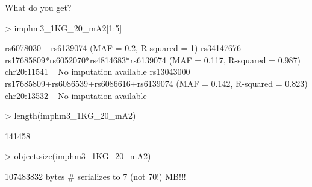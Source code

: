 \clearpage

{\huge What do you get?}

\begin{Schunk}
\begin{Sinput}
> imphm3_1KG_20_mA2[1:5]
\end{Sinput}
\begin{Soutput}
rs6078030  ~  rs6139074 (MAF = 0.2, R-squared = 1)
rs34147676  ~  rs17685809*rs6052070*rs4814683*rs6139074 (MAF = 0.117, 
                   R-squared = 0.987)
chr20:11541 ~ No imputation available
rs13043000  ~  rs17685809+rs6086539+rs6086616+rs6139074 (MAF = 0.142, 
                   R-squared = 0.823)
chr20:13532 ~ No imputation available
\end{Soutput}
\begin{Sinput}
> length(imphm3_1KG_20_mA2)
\end{Sinput}
\begin{Soutput}
[1] 141458
\end{Soutput}
\begin{Sinput}
> object.size(imphm3_1KG_20_mA2)
\end{Sinput}
\begin{Soutput}
107483832 bytes  # serializes to 7 (not 70!) MB!!!
\end{Soutput}
\end{Schunk}

\clearpage

